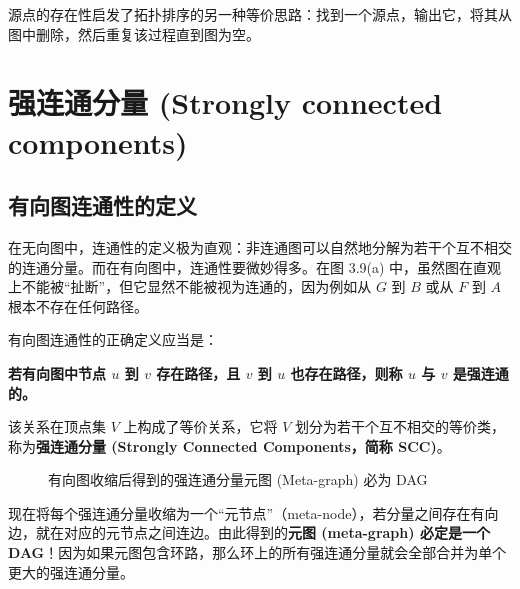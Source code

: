 源点的存在性启发了拓扑排序的另一种等价思路：找到一个源点，输出它，将其从图中删除，然后重复该过程直到图为空。

\section{强连通分量 (Strongly connected components)}

\subsection{有向图连通性的定义}
在无向图中，连通性的定义极为直观：非连通图可以自然地分解为若干个互不相交的连通分量。而在有向图中，连通性要微妙得多。在图 3.9(a) 中，虽然图在直观上不能被“扯断”，但它显然不能被视为连通的，因为例如从 $G$ 到 $B$ 或从 $F$ 到 $A$ 根本不存在任何路径。

有向图连通性的正确定义应当是：
\begin{center}
    \textbf{若有向图中节点 $u$ 到 $v$ 存在路径，且 $v$ 到 $u$ 也存在路径，则称 $u$ 与 $v$ 是强连通的。}
\end{center}

该关系在顶点集 $V$ 上构成了等价关系，它将 $V$ 划分为若干个互不相交的等价类，称为\textbf{强连通分量 (Strongly Connected Components，简称 SCC)}。

\begin{figure}[htbp]
\centering
{}
\caption{有向图收缩后得到的强连通分量元图 (Meta-graph) 必为 DAG}
\label{fig:meta_dag}
\end{figure}

现在将每个强连通分量收缩为一个“元节点”（meta-node），若分量之间存在有向边，就在对应的元节点之间连边。由此得到的\textbf{元图 (meta-graph) 必定是一个 DAG}！因为如果元图包含环路，那么环上的所有强连通分量就会全部合并为单个更大的强连通分量。

